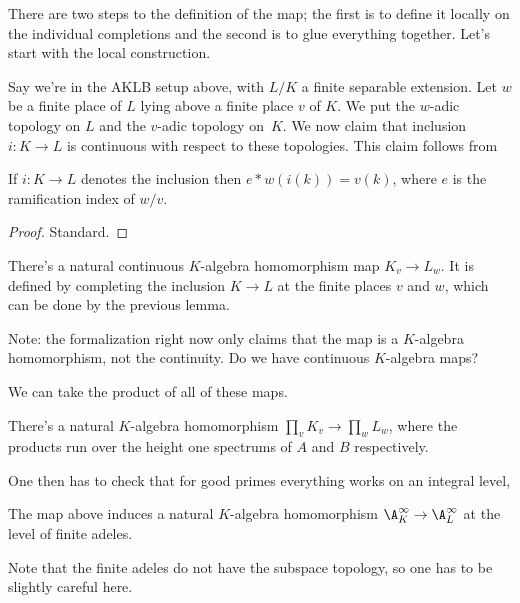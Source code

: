 There are two steps to the definition of the map; the first is to define it locally
on the individual completions and the second is to glue everything together. Let's
start with the local construction.

Say we're in the AKLB setup above, with $L/K$ a finite separable extension.
Let $w$ be a finite place of $L$ lying above a finite place $v$ of $K$.
We put the $w$-adic topology on $L$ and the $v$-adic topology on~$K$. We now claim
that inclusion $i:K\to L$ is continuous with respect to these topologies. This
claim follows from

\begin{lemma} If $i:K\to L$ denotes the inclusion then $e*w(i(k))=v(k)$, where
  $e$ is the ramification index of $w/v$.
  \label{IsDedekindDomain.HeightOneSpectrum.valuation_comap}
\end{lemma}
\begin{proof}
  \leanok
  Standard.
\end{proof}

\begin{definition}
  \label{IsDedekindDomain.HeightOneSpectrum.adicCompletion_comap_algHom}
  There's a natural continuous $K$-algebra homomorphism map $K_v\to L_w$. It is defined by completing
  the inclusion $K\to L$ at the finite places $v$ and $w$, which can be done
  by the previous lemma.
\end{definition}

Note: the formalization right now only claims that the map is a $K$-algebra homomorphism,
not the continuity. Do we have continuous $K$-algebra maps?

We can take the product of all of these maps.

\begin{definition}
  \label{DedekindDomain.ProdAdicCompletions.baseChange}
  There's a natural $K$-algebra homomorphism $\prod_v K_v\to\prod_w L_w$, where the
  products run over the height one spectrums of $A$ and $B$ respectively.
\end{definition}

One then has to check that for good primes everything works on an integral level,

\begin{definition}
  The map above induces a natural $K$-algebra homomorphism $\A_K^\infty\to\A_L^\infty$
  at the level of finite adeles.
\end{definition}

Note that the finite adeles do not have the subspace topology, so one has to be slightly
careful here.
